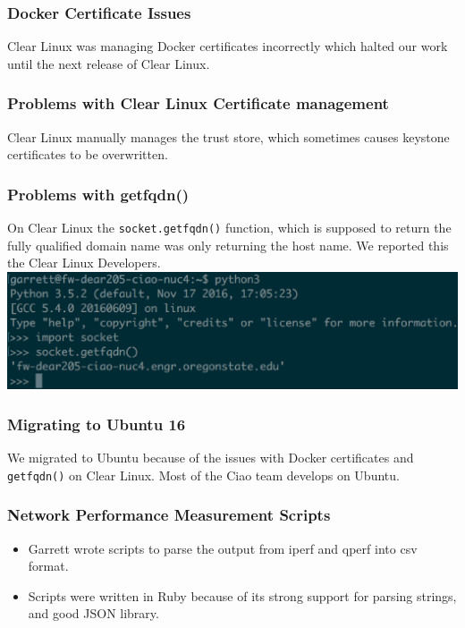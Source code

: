 \documentclass[pdf]{beamer}
\begin{document}
\begin{frame}
	\frametitle{Docker Certificate Issues}
	Clear Linux was managing Docker certificates incorrectly which halted
	our work until the next release of Clear Linux.
\end{frame}

\begin{frame}
	\frametitle{Problems with Clear Linux Certificate management}
	Clear Linux manually manages the trust store, which sometimes causes
	keystone certificates to be overwritten.
\end{frame}

\begin{frame}
	\frametitle{Problems with getfqdn()}
	On Clear Linux the \texttt{socket.getfqdn()} function, which is supposed
	to return the fully qualified domain name was only returning the host
	name. We reported this the Clear Linux Developers.
	\includegraphics[scale=0.5]{getfqdn.eps}
\end{frame}

\begin{frame}
	\frametitle{Migrating to Ubuntu 16}
	We migrated to Ubuntu because of the issues with Docker certificates and
	\texttt{getfqdn()} on Clear Linux. Most of the Ciao team develops on
	Ubuntu.
\end{frame}

\begin{frame}
	\frametitle{Network Performance Measurement Scripts}
	\begin{itemize}
		\item Garrett wrote scripts to parse the output from iperf and qperf into csv format.
		\item Scripts were written in Ruby because of its strong support for parsing strings, and good JSON library.
	\end{itemize}
\end{frame}
\end{document}
